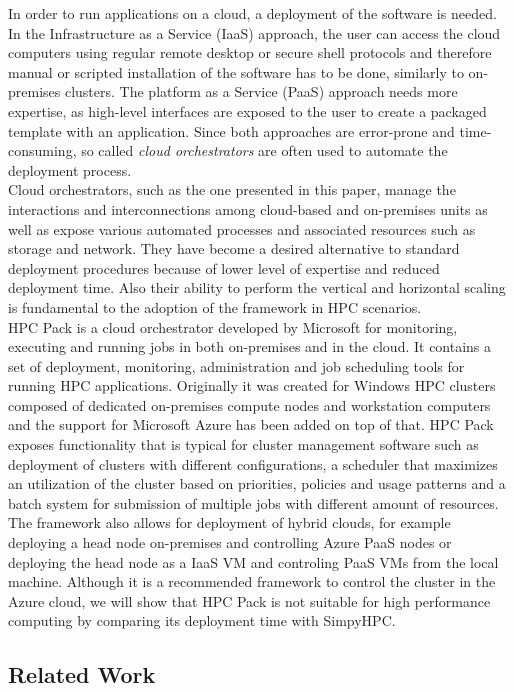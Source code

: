 \documentclass[a4paper,twoside]{article}
\begin{document}
In order to run applications on a cloud, a deployment of the software is needed. In the Infrastructure as a Service (IaaS) approach, the user can access the cloud computers using regular remote desktop or secure shell protocols and therefore manual or scripted installation of the software has to be done, similarly to on-premises clusters. The platform as a Service (PaaS) approach needs more expertise, as high-level interfaces are exposed to the user to create a packaged template with an application. Since both approaches are error-prone and time-consuming, so called \textit{cloud orchestrators} are often used to automate the deployment process. \\
Cloud orchestrators, such as the one presented in this paper, manage the interactions and interconnections among cloud-based and on-premises units as well as expose various automated processes and associated resources such as storage and network. They have become a desired alternative to standard deployment procedures because of lower level of expertise and reduced deployment time.  Also their ability to perform the vertical and horizontal scaling is fundamental to the adoption of the framework in HPC scenarios. \\
HPC Pack is a cloud orchestrator developed by Microsoft for monitoring, executing and running jobs in both on-premises and in the cloud. It contains a set of deployment, monitoring, administration and job scheduling tools for running HPC applications. Originally it was created for Windows HPC clusters composed of dedicated on-premises compute nodes and workstation computers and the support for Microsoft Azure has been added on top of that. HPC Pack exposes functionality that is typical for cluster management software such as deployment of clusters with different configurations, a scheduler that maximizes an utilization of the cluster based on priorities, policies and usage patterns and a batch system for submission of multiple jobs with different amount of resources. The framework also allows for deployment of hybrid clouds, for example deploying a head node on-premises and controlling Azure PaaS nodes or deploying the head node as a IaaS VM and controling PaaS VMs from the local machine. Although it is a recommended framework to control the cluster in the Azure cloud, we will show that HPC Pack is not suitable for high performance computing by comparing its deployment time with SimpyHPC.  

\subsection{Related Work}	
\end{document}
